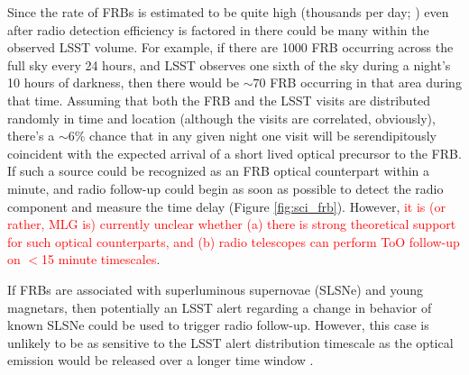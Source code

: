 \documentclass[DM,lsstdraft,authoryear,toc]{lsstdoc}
\begin{document}
Since the rate of FRBs is estimated to be quite high (thousands per day; \citealt{2016MNRAS.460L..30C}) even after radio detection efficiency is factored in there could be many within the observed LSST volume. 
For example, if there are 1000 FRB occurring across the full sky every 24 hours, and LSST observes one sixth of the sky during a night's 10 hours of darkness, then there would be $\sim70$ FRB occurring in that area during that time.
Assuming that both the FRB and the LSST visits are distributed randomly in time and location (although the visits are correlated, obviously), there's a $\sim6\%$ chance that in any given night one visit will be serendipitously coincident with the expected arrival of a short lived optical precursor to the FRB.
If such a source could be recognized as an FRB optical counterpart within a minute, and radio follow-up could begin as soon as possible to detect the radio component and measure the time delay (Figure \ref{fig:sci_frb}).  
However, \textcolor{red}{it is (or rather, MLG is) currently unclear whether (a) there is strong theoretical support for such optical counterparts, and (b) radio telescopes can perform ToO follow-up on $<$15 minute timescales}.

If FRBs are associated with superluminous supernovae (SLSNe) and young magnetars, then potentially an LSST alert regarding a change in behavior of known SLSNe could be used to trigger radio follow-up.
However, this case is unlikely to be as sensitive to the LSST alert distribution timescale as the optical emission would be released over a longer time window \citep{2019arXiv191002036L}.
\end{document}
